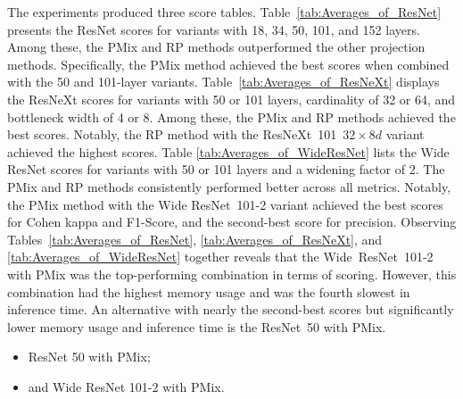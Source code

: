 The experiments produced three score tables.
Table~\ref{tab:Averages_of_ResNet} presents the ResNet scores for variants with 18, 34, 50, 101, and 152 layers. Among these, the \gls{PMix} and \gls{RP} methods outperformed the other projection methods. Specifically, the \gls{PMix} method achieved the best scores when combined with the 50 and 101-layer variants.
Table~\ref{tab:Averages_of_ResNeXt} displays the ResNeXt scores for variants with 50 or 101 layers, cardinality of 32 or 64, and bottleneck width of 4 or 8. Among these, the \gls{PMix} and \gls{RP} methods achieved the best scores. Notably, the \gls{RP} method with the \mbox{ResNeXt 101 $32\times 8d$} variant achieved the highest scores.
Table \ref{tab:Averages_of_WideResNet} lists the Wide ResNet scores for variants with 50 or 101 layers and a widening factor of 2. The \gls{PMix} and \gls{RP} methods consistently performed better across all metrics. Notably, the \gls{PMix} method with the Wide \mbox{ResNet 101-2} variant achieved the best scores for Cohen kappa and F1-Score, and the second-best score for precision.
Observing Tables~\ref{tab:Averages_of_ResNet}, \ref{tab:Averages_of_ResNeXt}, and \ref{tab:Averages_of_WideResNet} together reveals that the \mbox{Wide ResNet 101-2} with \gls{PMix} was the top-performing combination in terms of scoring. However, this combination had the highest memory usage and was the fourth slowest in inference time. An alternative with nearly the second-best scores but significantly lower memory usage and inference time is the \mbox{ResNet 50} with \gls{PMix}.  
\begin{itemize}
	\item ResNet 50 with \gls{PMix}; 
	\item and Wide ResNet 101-2 with \gls{PMix}. 
\end{itemize}



